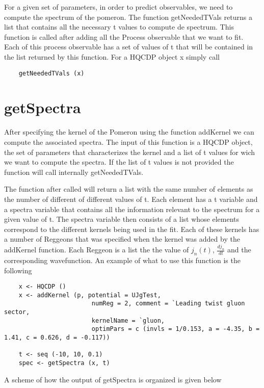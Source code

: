 \documentclass{book}
\begin{document}
For a given set of parameters, in order to predict observables, we need to compute the spectrum of the pomeron. The function getNeededTVals returns a list that contains all the necessary t values to compute de spectrum. This function is called after adding all the Process observable that we want to fit. Each of this process observable has a set of values of t that will be contained in the list returned by this function. For a HQCDP object x simply call
\begin{lstlisting}
    getNeededTVals (x)
\end{lstlisting}

\section{getSpectra}

After specifying the kernel of the Pomeron using the function addKernel we can compute the associated spectra. The input of this function is a HQCDP object, the set of parameters that characterizes the kernel and a list of t values for wich we want to compute the spectra. If the list of t values is not provided the function will call internally getNeededTVals. 

The function after called will return a list with the same number of elements as the number of different of different values of t. Each element has a t variable and a spectra variable that contains all the information relevant to the spectrum for a given value of t. The spectra variable then consists of a list whose elements correspond to the different kernels being used in the fit. Each of these kernels has a number of Reggeons that was specified when the kernel was added by the addKernel function. Each Reggeon is a list the the value of $j_n\left(t\right)$, $\frac{d j_n}{d t}$ and the corresponding wavefunction. An example of what to use this function is the following
\begin{lstlisting}
    x <- HQCDP ()
    x <- addKernel (p, potential = UJgTest,
                        numReg = 2, comment = `Leading twist gluon sector,
                        kernelName = `gluon,
                        optimPars = c (invls = 1/0.153, a = -4.35, b = 1.41, c = 0.626, d = -0.117))

    t <- seq (-10, 10, 0.1)
    spec <- getSpectra (x, t)
\end{lstlisting}
A scheme of how the output of getSpectra is organized is given below
\end{document}

